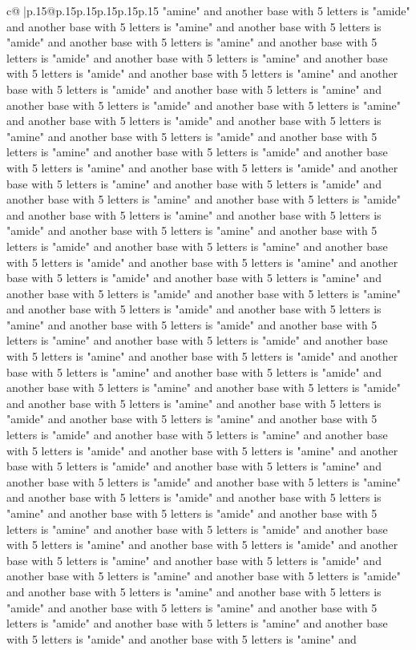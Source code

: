 \documentclass{article}
\begin{document}
{\begin{supertabular}{c@{$\;$}|p{.15\linewidth}@{}p{.15\linewidth}p{.15\linewidth}p{.15\linewidth}p{.15\linewidth}p{.15\linewidth}}
{{{"amine" and another base with 5 letters is "amide" and another base with 5 letters is "amine" and another base with 5 letters is "amide" and another base with 5 letters is "amine" and another base with 5 letters is "amide" and another base with 5 letters is "amine" and another base with 5 letters is "amide" and another base with 5 letters is "amine" and another base with 5 letters is "amide" and another base with 5 letters is "amine" and another base with 5 letters is "amide" and another base with 5 letters is "amine" and another base with 5 letters is "amide" and another base with 5 letters is "amine" and another base with 5 letters is "amide" and another base with 5 letters is "amine" and another base with 5 letters is "amide" and another base with 5 letters is "amine" and another base with 5 letters is "amide" and another base with 5 letters is "amine" and another base with 5 letters is "amide" and another base with 5 letters is "amine" and another base with 5 letters is "amide" and another base with 5 letters is "amine" and another base with 5 letters is "amide" and another base with 5 letters is "amine" and another base with 5 letters is "amide" and another base with 5 letters is "amine" and another base with 5 letters is "amide" and another base with 5 letters is "amine" and another base with 5 letters is "amide" and another base with 5 letters is "amine" and another base with 5 letters is "amide" and another base with 5 letters is "amine" and another base with 5 letters is "amide" and another base with 5 letters is "amine" and another base with 5 letters is "amide" and another base with 5 letters is "amine" and another base with 5 letters is "amide" and another base with 5 letters is "amine" and another base with 5 letters is "amide" and another base with 5 letters is "amine" and another base with 5 letters is "amide" and another base with 5 letters is "amine" and another base with 5 letters is "amide" and another base with 5 letters is "amine" and another base with 5 letters is "amide" and another base with 5 letters is "amine" and another base with 5 letters is "amide" and another base with 5 letters is "amine" and another base with 5 letters is "amide" and another base with 5 letters is "amine" and another base with 5 letters is "amide" and another base with 5 letters is "amine" and another base with 5 letters is "amide" and another base with 5 letters is "amine" and another base with 5 letters is "amide" and another base with 5 letters is "amine" and another base with 5 letters is "amide" and another base with 5 letters is "amine" and another base with 5 letters is "amide" and another base with 5 letters is "amine" and another base with 5 letters is "amide" and another base with 5 letters is "amine" and another base with 5 letters is "amide" and another base with 5 letters is "amine" and another base with 5 letters is "amide" and another base with 5 letters is "amine" and another base with 5 letters is "amide" and another base with 5 letters is "amine" and another base with 5 letters is "amide" and another base with 5 letters is "amine" and another base with 5 letters is "amide" and another base with 5 letters is "amine" and }}}
\end{supertabular}}
\end{document}
